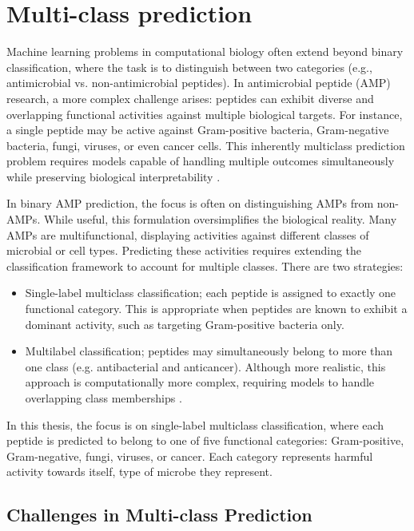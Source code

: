 \documentclass[a4paper,twoside,12pt]{book}
\begin{document}
\section{Multi-class prediction}

Machine learning problems in computational biology often extend beyond binary classification, where the task is to distinguish between two categories (e.g., antimicrobial vs. non-antimicrobial peptides). In antimicrobial peptide (AMP) research, a more complex challenge arises: peptides can exhibit diverse and overlapping functional activities against multiple biological targets. For instance, a single peptide may be active against Gram-positive bacteria, Gram-negative bacteria, fungi, viruses, or even cancer cells. This inherently multiclass prediction problem requires models capable of handling multiple outcomes simultaneously while preserving biological interpretability \cite{bib:rashid2021}.

In binary AMP prediction, the focus is often on distinguishing AMPs from non-AMPs. While useful, this formulation oversimplifies the biological reality. Many AMPs are multifunctional, displaying activities against different classes of microbial or cell types. Predicting these activities requires extending the classification framework to account for multiple classes. There are two strategies: 

\begin{itemize}
    \item Single-label multiclass classification; each peptide is assigned to exactly one functional category. This is appropriate when peptides are known to exhibit a dominant activity, such as targeting Gram-positive bacteria only.

    \item Multilabel classification; peptides may simultaneously belong to more than one class (e.g. antibacterial and anticancer). Although more realistic, this approach is computationally more complex, requiring models to handle overlapping class memberships \cite{bib:zhang2014}.
\end{itemize}

In this thesis, the focus is on single-label multiclass classification, where each peptide is predicted to belong to one of five functional categories: Gram-positive, Gram-negative, fungi, viruses, or cancer. Each category represents harmful activity towards itself, type of microbe they represent. 

\subsection{Challenges in Multi-class Prediction}
\end{document}
